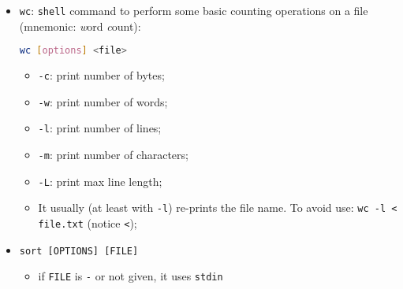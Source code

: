 \documentclass[a4paper,12pt,%
              final%
              ]{article}
\begin{document}
\begin{itemize}
\begin{lstlisting}[language=bash]
echo "Message Body Here" | \
    mail -s "Subject Here" -A attachment.txt user@example.com
\end{lstlisting}
    \begin{itemize}
      \item Other useful options:
        \begin{itemize}
          \item \verb|-c me@me.me|: CC-address
          \item \verb|-b me@me.me|: BCC-address
          \item \verb|-r me@me.me|: sender address
        \end{itemize}
      \item Use file as body of the message: option \verb|-q file.txt|. \textbf{However}, this might not work as expected: if the command finds non-standard charcters, even new-lines (!) instead of using the text it will attach it as a binary file. The following might work (see this \href{https://unix.stackexchange.com/a/522868/502731}{SO discussion}):
\begin{lstlisting}[language=bash]
tr -cd "[:print:]\n" < file.txt | \
    mailx -s "Subject Here" user@example.com
\end{lstlisting}
    \end{itemize}
  \item \texttt{wc}: \texttt{shell} command to perform some basic counting operations on a file (mnemonic: \emph{w}ord \emph{c}ount):
\begin{lstlisting}[language=bash]
wc [options] <file>
\end{lstlisting}
    \begin{itemize}
      \item \verb|-c|: print number of bytes;
      \item \verb|-w|: print number of words;
      \item \verb|-l|: print number of lines;
      \item \verb|-m|: print number of characters;
      \item \verb|-L|: print max line length;
      \item It usually (at least with \verb|-l|) re-prints the file name. To avoid use: \verb|wc -l < file.txt| (notice \verb|<|);
    \end{itemize}
  \item \texttt{sort [OPTIONS] [FILE]}
    \begin{itemize}
      \item if \texttt{FILE} is \texttt{-} or not given, it uses \texttt{stdin}

\end{itemize}
\end{itemize}
\end{document}
